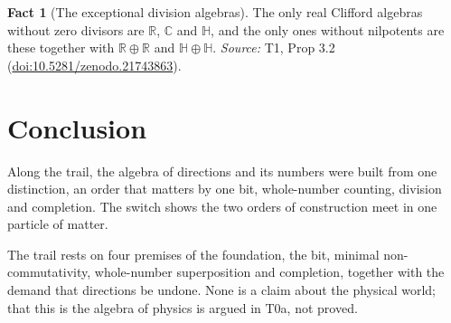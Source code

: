 \documentclass[11pt]{article}
\theoremstyle{definition}
\newtheorem{fact}[theorem]{Fact}
\theoremstyle{plain}
\providecommand{\C}{}\renewcommand{\C}{\mathbb{C}}
\providecommand{\HH}{}\renewcommand{\HH}{\mathbb{H}}
\providecommand{\R}{}\renewcommand{\R}{\mathbb{R}}
\begin{document}
\begin{fact}[The exceptional division algebras]\label{c:transport.exceptional-division-algebras}
The only real Clifford algebras without zero divisors are $\R$, $\C$ and $\HH$, and the only ones without nilpotents are these together with $\R \oplus \R$ and $\HH \oplus \HH$.
\emph{Source:} T1, Prop 3.2 (\href{https://doi.org/10.5281/zenodo.21743863}{doi:10.5281/zenodo.21743863}).
\end{fact}

\section*{Conclusion}
Along the trail, the algebra of directions and its numbers were built from one distinction, an order that matters by one bit, whole-number counting, division and completion. The switch shows the two orders of construction meet in one particle of matter.

The trail rests on four premises of the foundation, the bit, minimal non-commutativity, whole-number superposition and completion, together with the demand that directions be undone. None is a claim about the physical world; that this is the algebra of physics is argued in T0a, not proved.
\end{document}
